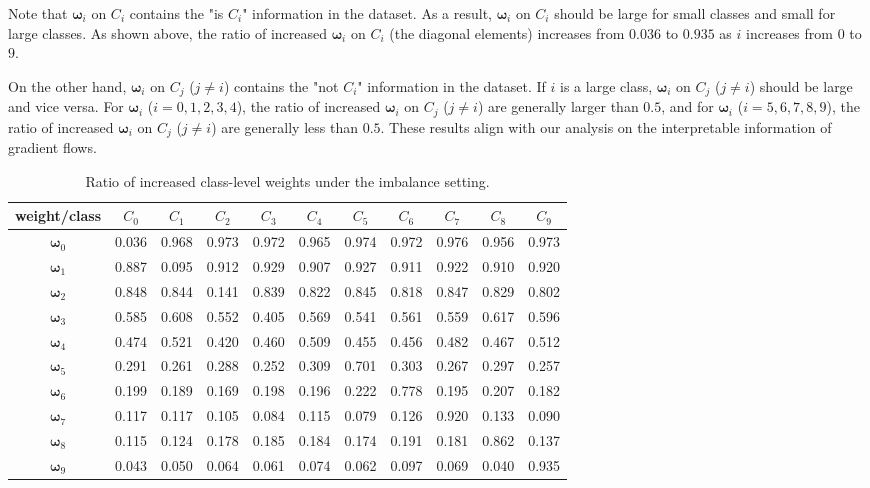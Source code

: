 Note that $\boldsymbol \omega_i$ on $C_i$ contains the "is $C_i$" information in the dataset. As a result, $\boldsymbol \omega_i$ on $C_i$ should be large for small classes and small for large classes. As shown above, the ratio of increased $\boldsymbol \omega_i$ on $C_i$ (the diagonal elements) increases from $0.036$ to $0.935$ as $i$ increases from $0$ to $9$.

On the other hand, $\boldsymbol \omega_i$ on $C_j$ ($j \neq i$) contains the "not $C_i$" information in the dataset. If $i$ is a large class, $\boldsymbol \omega_i$ on $C_j$ ($j \neq i$) should be large and vice versa. For $\boldsymbol \omega_i$ ($i=0, 1, 2, 3, 4$), the ratio of increased $\boldsymbol \omega_i$ on $C_j$ ($j \neq i$) are generally larger than $0.5$, and for $\boldsymbol \omega_i$ ($i=5, 6, 7, 8, 9$), the ratio of increased $\boldsymbol \omega_i$ on $C_j$ ($j \neq i$) are generally less than $0.5$. These results align with our analysis on the interpretable information of gradient flows.

\begin{table}[htbp]
    \centering
    \caption{Ratio of increased class-level weights under the imbalance setting.}
    \label{tab: imb_C}
    \begin{tabular}{@{}ccccccccccc@{}}
    \toprule
weight/class & \(C_0\) & \(C_1\) & \(C_2\) & \(C_3\) & \(C_4\) & \(C_5\)
& \(C_6\) & \(C_7\) & \(C_8\) & \(C_9\) \\
\midrule
\(\boldsymbol\omega_0\) & 0.036 & 0.968 & 0.973 & 0.972 & 0.965 & 0.974 & 0.972 &
0.976 & 0.956 & 0.973 \\
\(\boldsymbol\omega_1\) & 0.887 & 0.095 & 0.912 & 0.929 & 0.907 & 0.927 & 0.911 &
0.922 & 0.910 & 0.920 \\
\(\boldsymbol\omega_2\) & 0.848 & 0.844 & 0.141 & 0.839 & 0.822 & 0.845 & 0.818 &
0.847 & 0.829 & 0.802 \\
\(\boldsymbol\omega_3\) & 0.585 & 0.608 & 0.552 & 0.405 & 0.569 & 0.541 & 0.561 &
0.559 & 0.617 & 0.596 \\
\(\boldsymbol\omega_4\) & 0.474 & 0.521 & 0.420 & 0.460 & 0.509 & 0.455 & 0.456 &
0.482 & 0.467 & 0.512 \\
\(\boldsymbol\omega_5\) & 0.291 & 0.261 & 0.288 & 0.252 & 0.309 & 0.701 & 0.303 &
0.267 & 0.297 & 0.257 \\
\(\boldsymbol\omega_6\) & 0.199 & 0.189 & 0.169 & 0.198 & 0.196 & 0.222 & 0.778 &
0.195 & 0.207 & 0.182 \\
\(\boldsymbol\omega_7\) & 0.117 & 0.117 & 0.105 & 0.084 & 0.115 & 0.079 & 0.126 &
0.920 & 0.133 & 0.090 \\
\(\boldsymbol\omega_8\) & 0.115 & 0.124 & 0.178 & 0.185 & 0.184 & 0.174 & 0.191 &
0.181 & 0.862 & 0.137 \\
\(\boldsymbol\omega_9\) & 0.043 & 0.050 & 0.064 & 0.061 & 0.074 & 0.062 & 0.097 &
0.069 & 0.040 & 0.935 \\
\bottomrule
    \end{tabular}
\end{table}
